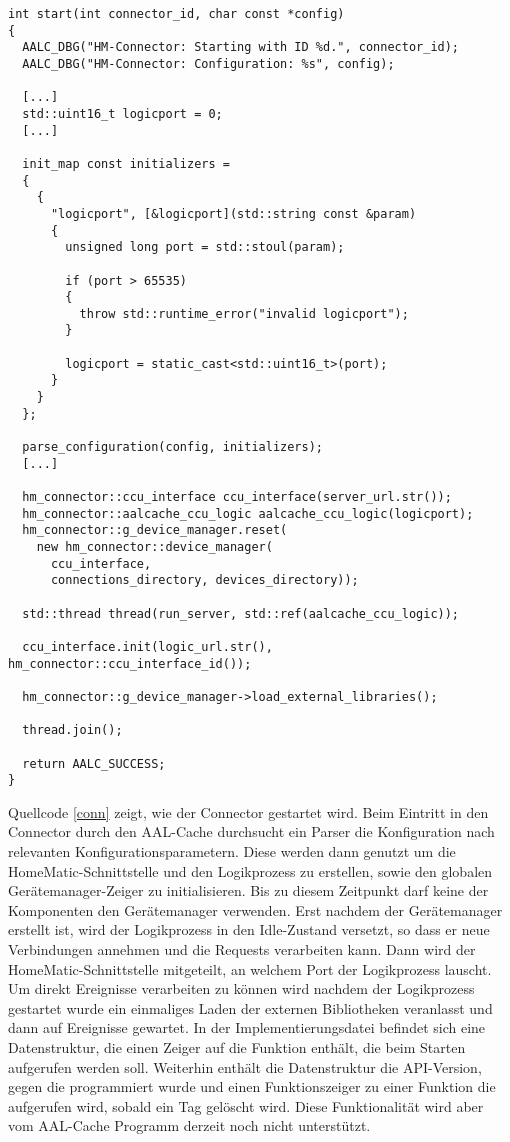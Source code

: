 \lstset{language=C++}
\begin{lstlisting}[frame=single,caption={Ausschnitt der Eintrittsfunktion des Connectors},label=conn]
int start(int connector_id, char const *config)
{
  AALC_DBG("HM-Connector: Starting with ID %d.", connector_id);
  AALC_DBG("HM-Connector: Configuration: %s", config);

  [...]
  std::uint16_t logicport = 0;
  [...]

  init_map const initializers =
  {
    {
      "logicport", [&logicport](std::string const &param)
      {
        unsigned long port = std::stoul(param);

        if (port > 65535)
        {
          throw std::runtime_error("invalid logicport");
        }

        logicport = static_cast<std::uint16_t>(port);
      }
    }
  };

  parse_configuration(config, initializers);
  [...]

  hm_connector::ccu_interface ccu_interface(server_url.str());
  hm_connector::aalcache_ccu_logic aalcache_ccu_logic(logicport);
  hm_connector::g_device_manager.reset(
    new hm_connector::device_manager(
      ccu_interface,
      connections_directory, devices_directory));

  std::thread thread(run_server, std::ref(aalcache_ccu_logic));

  ccu_interface.init(logic_url.str(), hm_connector::ccu_interface_id());

  hm_connector::g_device_manager->load_external_libraries();

  thread.join();

  return AALC_SUCCESS;
}
\end{lstlisting}

Quellcode \ref{conn} zeigt, wie der Connector gestartet wird.
Beim Eintritt in den Connector durch den AAL-Cache durchsucht ein Parser die Konfiguration nach relevanten
Konfigurationsparametern.
Diese werden dann genutzt um die HomeMatic-Schnittstelle und den Logikprozess zu erstellen, sowie
den globalen Gerätemanager-Zeiger zu initialisieren.
Bis zu diesem Zeitpunkt darf keine der Komponenten den Gerätemanager verwenden.
Erst nachdem der Gerätemanager erstellt ist, wird der Logikprozess in den Idle-Zustand versetzt, so
dass er neue Verbindungen annehmen und die Requests verarbeiten kann.
Dann wird der HomeMatic-Schnittstelle mitgeteilt, an welchem Port der Logikprozess lauscht.
Um direkt Ereignisse verarbeiten zu können wird nachdem der Logikprozess gestartet wurde ein
einmaliges Laden der externen Bibliotheken veranlasst und dann auf Ereignisse gewartet.
In der Implementierungsdatei befindet sich eine Datenstruktur, die einen Zeiger auf die Funktion enthält,
die beim Starten aufgerufen werden soll.
Weiterhin enthält die Datenstruktur die API-Version, gegen die programmiert wurde und einen Funktionszeiger
zu einer Funktion die aufgerufen wird, sobald ein Tag gelöscht wird.
Diese Funktionalität wird aber vom AAL-Cache Programm derzeit noch nicht unterstützt.

